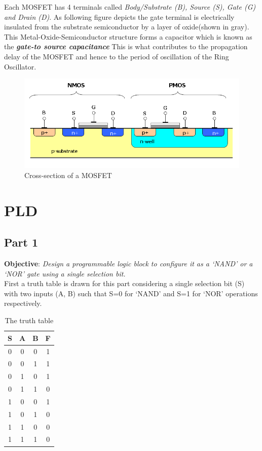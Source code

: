 \documentclass[a4paper,11pt]{article}%
\begin{document}
Each MOSFET has 4 terminals called \textit{Body/Substrate (B), Source (S), Gate (G) and Drain (D)}. As following figure depicts the gate terminal is electrically insulated from the substrate semiconductor by a layer of oxide(shown in gray). This Metal-Oxide-Semiconductor structure forms a capacitor which is known as the \textbf{\textit{gate-to source capacitance}} This is what contributes to the propagation delay of the MOSFET and hence to the period of oscillation of the Ring Oscillator.

\begin{figure}[H]
	\centering
	\includegraphics[scale=0.5]{figures/Cmos_impurity_profile.png}
	\caption{Cross-section of a MOSFET\cite{mosfet}}
\end{figure}

\pagebreak
\section{PLD}
\subsection{Part 1}
\textbf{Objective}: \textit{Design a programmable logic block to configure it as a `NAND' or a `NOR' gate using a single selection bit.}\\

First a truth table is drawn for this part considering a single selection bit (S) with two inputs (A, B) such that S=0 for ‘NAND’ and S=1 for ‘NOR’ operations respectively.
\begin{table}[H]
	\centering
	\begin{tabular}{|c |c| c| c|}
		\hline
		S & A & B & F \\\hline
		0 & 0 & 0 & 1 \\
		0 & 0 & 1 & 1 \\
		0 & 1 & 0 & 1 \\
		0 & 1 & 1 & 0 \\\hline
		1 & 0 & 0 & 1 \\
		1 & 0 & 1 & 0 \\
		1 & 1 & 0 & 0 \\
		1 & 1 & 1 & 0 \\\hline\hline
	\end{tabular}
\caption{The truth table}
\end{table}
\end{document}

